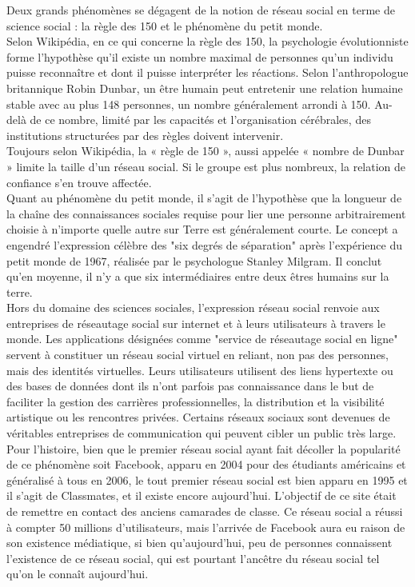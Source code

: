 \documentclass[12pt]{report}
\begin{document}
Deux grands phénomènes se dégagent de la notion de réseau social en terme de science social : la règle des 150 et le phénomène du petit monde. \\
Selon Wikipédia, en ce qui concerne la règle des 150, la psychologie évolutionniste forme l'hypothèse qu'il existe un nombre maximal de personnes qu'un individu puisse reconnaître et dont il puisse interpréter les réactions. 
Selon l'anthropologue britannique Robin Dunbar, un être humain peut entretenir une relation humaine stable avec au plus 148 personnes, un nombre généralement arrondi à 150. Au-delà de ce nombre, limité par les capacités et l'organisation cérébrales, des institutions structurées par des règles doivent intervenir.\\
Toujours selon Wikipédia, la « règle de 150 », aussi appelée « nombre de Dunbar » limite la taille d'un réseau social. Si le groupe est plus nombreux, la relation de confiance s'en trouve affectée. \\
Quant au phénomène du petit monde, il s'agit de l'hypothèse que la longueur de la chaîne des connaissances sociales requise pour lier une personne arbitrairement choisie à n'importe quelle autre sur Terre est généralement courte. Le concept a engendré l'expression célèbre des "six degrés de séparation" après l'expérience du petit monde de 1967, réalisée par le psychologue Stanley Milgram. Il conclut qu'en moyenne, il n'y a que six intermédiaires entre deux êtres humains sur la terre.\\

Hors du domaine des sciences sociales, l'expression réseau social renvoie aux entreprises de réseautage social sur internet et à leurs utilisateurs à travers le monde. Les applications désignées comme "service de réseautage social en ligne" servent à constituer un réseau social virtuel en reliant, non pas des personnes, mais des identités virtuelles. Leurs utilisateurs utilisent des liens hypertexte ou des bases de données dont ils n'ont parfois pas connaissance dans le but de faciliter la gestion des carrières professionnelles, la distribution et la visibilité artistique ou les rencontres privées. Certains réseaux sociaux sont devenues de véritables entreprises de communication qui peuvent cibler un public très large. \\

Pour l'histoire, bien que le premier réseau social ayant fait décoller la popularité de ce phénomène soit Facebook, apparu en 2004 pour des étudiants américains et généralisé à tous en 2006, le tout premier réseau social est bien apparu en 1995 et il s'agit de Classmates, et il existe encore aujourd'hui. L’objectif de ce site était de remettre en contact des anciens camarades de classe. Ce réseau social a réussi à compter 50 millions d'utilisateurs, mais l'arrivée de Facebook aura eu raison de son existence médiatique, si bien qu'aujourd'hui, peu de personnes connaissent l'existence de ce réseau social, qui est pourtant l'ancêtre du réseau social tel qu'on le connaît aujourd'hui. 
\end{document}
